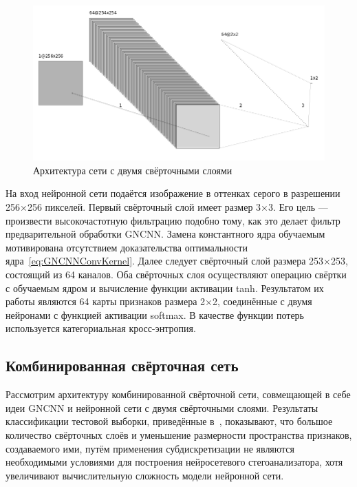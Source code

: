 \begin{figure}[!htb]
\centering
\includegraphics[width=1\textwidth]{include/graphics/french_gray_architecture}
\caption{Архитектура сети с двумя свёрточными слоями}
\label{fig:FrenchCNNArchitecture}
\end{figure}

На вход нейронной сети подаётся изображение в оттенках серого в разрешении 256×256 пикселей. Первый свёрточный слой имеет размер 3×3. Его цель --- произвести высокочастотную фильтрацию подобно тому, как это делает фильтр предварительной обработки GNCNN. Замена константного ядра обучаемым мотивирована отсутствием доказательства оптимальности ядра~\ref{eq:GNCNNConvKernel}. Далее следует свёрточный слой размера 253×253, состоящий из 64 каналов. Оба свёрточных слоя осуществляют операцию свёртки с обучаемым ядром и вычисление функции активации tanh. Результатом их работы являются 64 карты признаков размера 2×2, соединённые с двумя нейронами с функцией активации softmax. В качестве функции потерь используется категориальная кросс-энтропия.

\subsection{Комбинированная свёрточная сеть}
Рассмотрим архитектуру комбинированной свёрточной сети, совмещающей в себе идеи GNCNN и нейронной сети с двумя свёрточными слоями. Результаты классификации тестовой выборки, приведённые в~\cite{FrenchCNN}, показывают, что большое количество свёрточных слоёв и уменьшение размерности пространства признаков, создаваемого ими, путём применения субдискретизации не являются необходимыми условиями для построения нейросетевого стегоанализатора, хотя увеличивают вычислительную сложность модели нейронной сети.

